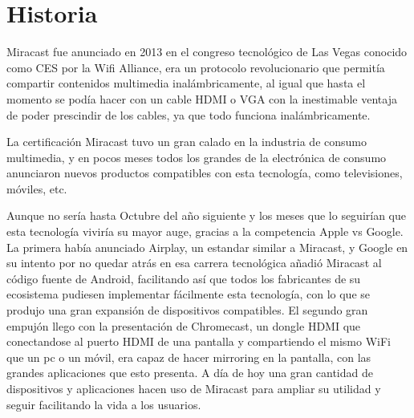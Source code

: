 \section{Historia}
Miracast fue anunciado en 2013 en el congreso tecnológico de Las Vegas conocido como CES por la Wifi Alliance, era un protocolo revolucionario que permitía compartir contenidos multimedia inalámbricamente, al igual que hasta el momento se podía hacer con un cable HDMI o VGA con la inestimable ventaja de poder prescindir de los cables, ya que todo funciona inalámbricamente.

La certificación Miracast tuvo un gran calado en la industria de consumo multimedia, y en pocos meses todos los grandes de la electrónica de consumo anunciaron nuevos productos compatibles con esta tecnología, como televisiones, móviles, etc.

Aunque no sería hasta Octubre del año siguiente y los meses que lo seguirían que esta tecnología viviría su mayor auge, gracias a la competencia Apple vs Google. La primera había anunciado Airplay, un estandar similar a Miracast, y Google en su intento por no quedar atrás en esa carrera tecnológica añadió Miracast al código fuente de Android, facilitando así que todos los fabricantes de su ecosistema pudiesen implementar fácilmente esta tecnología, con lo que se produjo una gran expansión de dispositivos compatibles.
El segundo gran empujón llego con la presentación de Chromecast, un dongle HDMI que conectandose al puerto HDMI de una pantalla y compartiendo el mismo WiFi que un pc o un móvil, era capaz de hacer mirroring en la pantalla, con las grandes aplicaciones que esto presenta.
A día de hoy una gran cantidad de dispositivos y aplicaciones hacen uso de Miracast para ampliar su utilidad y seguir facilitando la vida a los usuarios.

